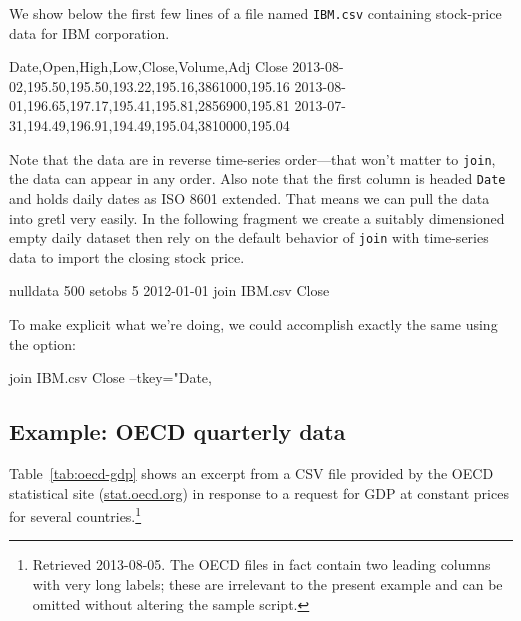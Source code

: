 We show below the first few lines of a file named \texttt{IBM.csv}
containing stock-price data for IBM corporation.

\begin{code}
Date,Open,High,Low,Close,Volume,Adj Close
2013-08-02,195.50,195.50,193.22,195.16,3861000,195.16
2013-08-01,196.65,197.17,195.41,195.81,2856900,195.81
2013-07-31,194.49,196.91,194.49,195.04,3810000,195.04
\end{code}

Note that the data are in reverse time-series order---that won't
matter to \texttt{join}, the data can appear in any order. Also note
that the first column is headed \texttt{Date} and holds daily dates as
ISO 8601 extended. That means we can pull the data into gretl very
easily. In the following fragment we create a suitably dimensioned
empty daily dataset then rely on the default behavior of \texttt{join}
with time-series data to import the closing stock price.

\begin{code}
nulldata 500
setobs 5 2012-01-01
join IBM.csv Close
\end{code}

To make explicit what we're doing, we could accomplish exactly the
same using the  option:

\begin{code}
join IBM.csv Close --tkey="Date,%
\end{code}

\subsection{Example: OECD quarterly data}

Table~\ref{tab:oecd-gdp} shows an excerpt from a CSV file provided
by the OECD statistical site (\url{stat.oecd.org}) in response to a
request for GDP at constant prices for several
countries.\footnote{Retrieved 2013-08-05. The OECD files in fact
  contain two leading columns with very long labels; these are irrelevant
  to the present example and can be omitted without altering the
  sample script.}

